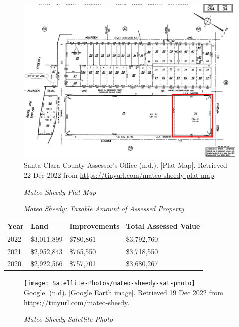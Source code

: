 \begin{figure}[hbt]
    \caption[Mateo Sheedy Plat Map]{\textit{Mateo Sheedy Plat Map}}\label{fig:mateo-sheedy-plat-map}\indent
    \includegraphics[width=\textwidth]{Assessor-Info/mateo-sheedy-plat-map-264-34}\\ %
    \footnotesize{Santa Clara County Assessor's Office (n.d.). [Plat Map]. Retrieved 22 Dec 2022 from  \url{https://tinyurl.com/mateo-sheedy-plat-map}}.
\end{figure}

\begin{table}[hbt]
  \SingleSpacing%
  \caption[Mateo Sheedy: Taxable Amount of Assessed Propery]{\textit{Mateo Sheedy: Taxable Amount of Assessed Property}}\label{tab:mateo-sheedy-taxable-amount}
  \begin{tabular}{llll}
    \toprule
    Year & Land        & Improvements & Total Assessed Value \\
    \midrule
    2022 & \$3,011,899 & \$780,861    & \$3,792,760 \\
    2021 & \$2,952,843 & \$765,550    & \$3,718,550 \\
    2020 & \$2,922,566 & \$757,701    & \$3,680,267 \\
    \bottomrule
  \end{tabular}
\end{table}

\begin{figure}[hbt]
  \caption[Mateo Sheedy Satellite Photo]{\textit{Mateo Sheedy Satellite Photo}}\label{fig:mateo-sheedy-sat-photo}
  \texttt{[image: Satellite-Photos/mateo-sheedy-sat-photo]}\\ %
  \footnotesize{Google. (n.d). [Google Earth image]. Retrieved 19 Dec 2022 from \url{https://tinyurl.com/mateo-sheedy}.}
\end{figure}

